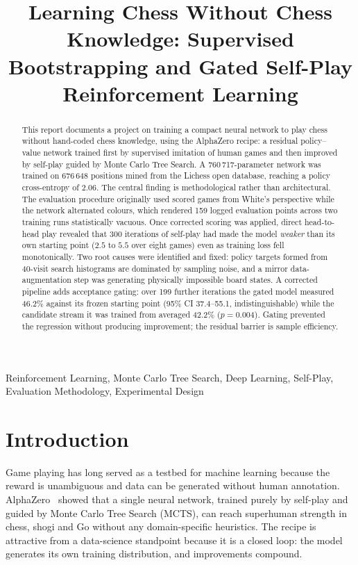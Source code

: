 \documentclass{article}
\title{Learning Chess Without Chess Knowledge: Supervised Bootstrapping
and Gated Self-Play Reinforcement Learning}
\begin{document}
\ninept
\maketitle

\begin{abstract}
This report documents a project on training a compact neural network to play
chess without hand-coded chess knowledge, using the AlphaZero recipe: a
residual policy--value network trained first by supervised imitation of human
games and then improved by self-play guided by Monte Carlo Tree Search. A
760\,717-parameter network was trained on 676\,648 positions mined
from the Lichess open database, reaching a policy cross-entropy of
2.06. The central finding is methodological rather than architectural.
The evaluation procedure originally used scored games from White's
perspective while the network alternated colours, which rendered 159
logged evaluation points across two training runs statistically vacuous.
Once corrected scoring was applied, direct head-to-head play revealed that
300 iterations of self-play had made the model \emph{weaker} than its
own starting point ($2.5$ to $5.5$ over eight games) even as training loss
fell monotonically. Two root causes were identified and fixed: policy
targets formed from 40-visit search histograms are dominated by
sampling noise, and a mirror data-augmentation step was generating
physically impossible board states. A corrected pipeline adds acceptance gating: over 199 further
iterations the gated model measured 46.2\% against its frozen starting point
(95\% CI 37.4--55.1, indistinguishable) while the candidate stream it was
trained from averaged 42.2\% ($p=0.004$). Gating prevented the regression
without producing improvement; the residual barrier is sample efficiency.
\end{abstract}

\begin{keywords}
Reinforcement Learning, Monte Carlo Tree Search, Deep Learning,
Self-Play, Evaluation Methodology, Experimental Design
\end{keywords}

\section{Introduction}

Game playing has long served as a testbed for machine learning because the
reward is unambiguous and data can be generated without human annotation.
AlphaZero~\cite{silver2018alphazero} showed that a single neural network,
trained purely by self-play and guided by Monte Carlo Tree Search (MCTS),
can reach superhuman strength in chess, shogi and Go without any
domain-specific heuristics. The recipe is attractive from a data-science
standpoint because it is a closed loop: the model generates its own training
distribution, and improvements compound.
\end{document}
